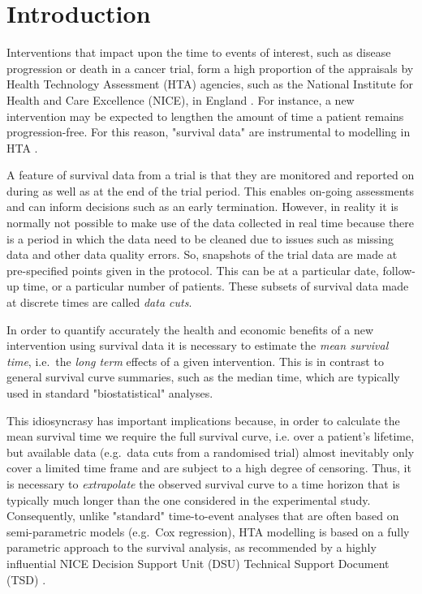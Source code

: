 \documentclass[AMA,STIX1COL]{WileyNJD-v2}
\begin{document}

\section{Introduction}\label{sec:intro}
Interventions that impact upon the time to events of interest, such as disease progression or death in a cancer trial, form a high proportion of the appraisals by Health Technology Assessment (HTA) agencies, such as the National Institute for Health and Care Excellence (NICE), in England \citep{Latimer2011}.
For instance, a new intervention may be expected to lengthen the amount of time a patient remains progression-free. For this reason, "survival data" are instrumental to modelling in HTA \cite{Demiris2006, Jackson2010}.

A feature of survival data from a trial is that they are monitored and reported on during as well as at the end of the trial period.
This enables on-going assessments and can inform decisions such as an early termination.
However, in reality it is normally not possible to make use of the data collected in real time because there is a period in which the data need to be cleaned due to issues such as missing data and other data quality errors.
So, snapshots of the trial data are made at pre-specified points given in the protocol.
This can be at a particular date, follow-up time, or a particular number of patients.
These subsets of survival data made at discrete times are called \textit{data cuts}.

In order to quantify accurately the health and economic benefits of a new intervention using survival data it is necessary to estimate the {\it mean survival time}, i.e.~the \textit{long term} effects of a given intervention.
This is in contrast to general survival curve summaries, such as the median time, which are typically used in standard "biostatistical" analyses.

This idiosyncrasy has important implications because, in order to calculate the mean survival time we require the full survival curve, i.e. over a patient's lifetime, but available data (e.g.~data cuts from a randomised trial) almost inevitably only cover a limited time frame and are subject to a high degree of censoring.
Thus, it is necessary to \textit{extrapolate} the observed survival curve to a time horizon that is typically much longer than the one considered in the experimental study.
Consequently, unlike "standard" time-to-event analyses that are often based on semi-parametric models (e.g.~Cox regression), HTA modelling is based on a fully parametric approach to the survival analysis, as recommended by a highly influential NICE Decision Support Unit (DSU) Technical Support Document (TSD) \citep{Latimer2011}.
\end{document}
